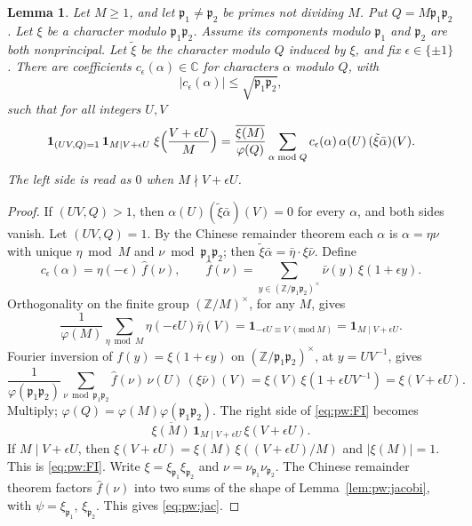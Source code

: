 \documentclass{amsart}
\newtheorem{lemma}{Lemma}[section]
\theoremstyle{definition}
\theoremstyle{plain}
\numberwithin{equation}{section}
\numberwithin{table}{section}
\begin{document}
\begin{lemma}\label{lem:pw:FI}
Let $M\ge1$, and let $\mathfrak p_1\ne\mathfrak p_2$ be primes not dividing $M$. Put
$Q=M\mathfrak p_1\mathfrak p_2$. Let $\xi$ be a character modulo
$\mathfrak p_1\mathfrak p_2$. Assume its components modulo $\mathfrak p_1$ and
$\mathfrak p_2$ are both nonprincipal. Let $\tilde\xi$ be the character modulo $Q$
induced by $\xi$, and fix $\epsilon\in\{\pm1\}$. There are coefficients
$c_\epsilon(\alpha)\in\mathbb C$ for characters $\alpha$ modulo $Q$, with
\begin{equation}\label{eq:pw:jac}
 |c_\epsilon(\alpha)|\le\sqrt{\mathfrak p_1\mathfrak p_2},
\end{equation}
such that for all integers $U,V$
\begin{equation}\label{eq:pw:FI}
 \mathbf 1_{(UV,Q)=1}\,\mathbf 1_{M\mid V+\epsilon U}\;
 \xi\Bigl(\frac{V+\epsilon U}{M}\Bigr)
 =\frac{\overline{\xi(M)}}{\varphi(Q)}\sum_{\alpha\bmod Q}
 c_\epsilon(\alpha)\,\alpha(U)\,(\tilde\xi\bar\alpha)(V).
\end{equation}
The left side is read as $0$ when $M\nmid V+\epsilon U$.
\end{lemma}

\begin{proof}
If $(UV,Q)>1$, then $\alpha(U)(\tilde\xi\bar\alpha)(V)=0$ for every $\alpha$,
and both sides vanish. Let $(UV,Q)=1$. By the Chinese remainder theorem each
$\alpha$ is $\alpha=\eta\nu$ with unique $\eta\bmod M$ and
$\nu\bmod \mathfrak p_1\mathfrak p_2$; then $\tilde\xi\bar\alpha=\bar\eta\cdot\xi\bar\nu$.
Define
\[
 c_\epsilon(\alpha)=\eta(-\epsilon)\,\hat f(\nu),\qquad
 \hat f(\nu)=\sum_{y\in(\mathbb Z/\mathfrak p_1\mathfrak p_2)^\times}\bar\nu(y)\,\xi(1+\epsilon y).
\]
Orthogonality on the finite group $(\mathbb Z/M)^\times$, for any $M$, gives
\[
 \frac1{\varphi(M)}\sum_{\eta\bmod M}\eta(-\epsilon U)\bar\eta(V)
 =\mathbf 1_{-\epsilon U\equiv V\ (\mathrm{mod}\ M)}=\mathbf 1_{M\mid V+\epsilon U}.
\]
Fourier inversion of $f(y)=\xi(1+\epsilon y)$ on $(\mathbb Z/\mathfrak p_1\mathfrak p_2)^\times$, at
$y=UV^{-1}$, gives
\[
 \frac1{\varphi(\mathfrak p_1\mathfrak p_2)}\sum_{\nu\bmod \mathfrak p_1\mathfrak p_2}\hat f(\nu)\,\nu(U)\,(\xi\bar\nu)(V)
 =\xi(V)\,\xi(1+\epsilon UV^{-1})=\xi(V+\epsilon U).
\]
Multiply; $\varphi(Q)=\varphi(M)\varphi(\mathfrak p_1\mathfrak p_2)$. The right side of
\eqref{eq:pw:FI} becomes
\[
 \overline{\xi(M)}\,\mathbf 1_{M\mid V+\epsilon U}\,\xi(V+\epsilon U).
\]
If
$M\mid V+\epsilon U$, then $\xi(V+\epsilon U)=\xi(M)\,\xi((V+\epsilon U)/M)$
and $|\xi(M)|=1$. This is \eqref{eq:pw:FI}. Write
$\xi=\xi_{\mathfrak p_1}\xi_{\mathfrak p_2}$ and
$\nu=\nu_{\mathfrak p_1}\nu_{\mathfrak p_2}$. The Chinese remainder theorem
factors $\hat f(\nu)$ into two sums of the shape of
Lemma~\ref{lem:pw:jacobi}, with $\psi=\xi_{\mathfrak p_1}$,
$\xi_{\mathfrak p_2}$. This gives
\eqref{eq:pw:jac}.
\end{proof}
\end{document}
